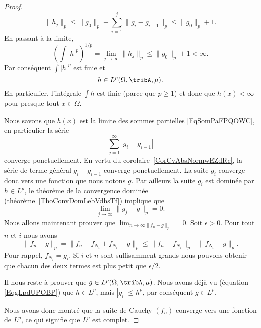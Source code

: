 \begin{proof}
    \begin{equation}
        \|h_j\|_p\leq \|g_0\|_p+\sum_{i=1}^j\|g_i-g_{i-1}\|_p\leq \|g_0\|_p+1.
    \end{equation}
    En passant à la limite,
    \begin{equation}
        \left( \int| h |^p \right)^{1/p}=\lim_{j\to \infty}\|h_j\|_p \leq \|g_0\|_p+1<\infty.
    \end{equation}
    Par conséquent \( \int| h |^p\) est finie et
    \begin{equation}    \label{EqgLpdUPOBP}
        h\in L^p(\Omega,\tribA,\mu).
    \end{equation}
    En particulier, l'intégrale \( \int h\) est finie (parce que \( p\geq 1\)) et donc que \( h(x)<\infty\) pour presque tout \( x\in\Omega\).

    Nous savons que \( h(x)\) est la limite des sommes partielles \eqref{EqSomPaFPQOWC}, en particulier la série
    \begin{equation}
        \sum_{j=1}^{\infty}| g_i-g_{i-1} |
    \end{equation}
    converge ponctuellement. En vertu du corolaire~\ref{CorCvAbsNormwEZdRc}, la série de terme général \( g_i-g_{i-1}\) converge ponctuellement. La suite \( g_i\) converge donc vers une fonction que nous notons \( g\). Par ailleurs la suite \( g_i\) est dominée par \( h\in L^p\), le théorème de la convergence dominée (théorème~\ref{ThoConvDomLebVdhsTf}) implique que
    \begin{equation}
        \lim_{j\to \infty} \|g_j-g\|_p=0.
    \end{equation}
    Nous allons maintenant prouver que \( \lim_{n\to \infty\|f_n-g\|_p} =0\). Soit \( \epsilon>0\). Pour tout \( n\) et \( i\) nous avons
    \begin{equation}
        \|f_n-g\|_p=\|f_n-f_{N_i}+f_{N_i}-g\|_p\leq\|f_n-f_{N_i}\|_p+\|f_{N_i}-g\|_p.
    \end{equation}
    Pour rappel, \( f_{N_i}=g_i\). Si \(i\) et \( n\) sont suffisamment grands nous pouvons obtenir que chacun des deux termes est plus petit que \( \epsilon/2\).

    Il nous reste à prouver que \( g\in L^p(\Omega,\tribA,\mu)\). Nous avons déjà vu (équation \eqref{EqgLpdUPOBP}) que \( h\in L^p\), mais \( | g_i |\leq h^p\), par conséquent  \( g\in L^p\).

    Nous avons donc montré que la suite de Cauchy \( (f_n)\) converge vers une fonction de \( L^p\), ce qui signifie que \( L^p\) est complet.
\end{proof}

